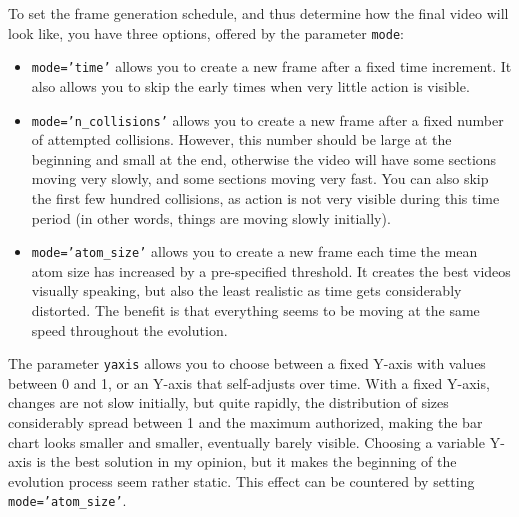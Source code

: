 \documentclass[oneside,10pt]{book}
\begin{document}
To set the frame generation schedule, and thus determine how the final video will look like, you have three options, offered
 by the parameter \texttt{mode}:\vspace{1ex}
\begin{itemize}
\item \texttt{mode='time'} allows you to create a new frame after a fixed time increment. It also allows you to skip the early times when very little action is visible.
\item \texttt{mode='n\_collisions'} allows you to create a new frame after a fixed number of attempted collisions. However, this
  number should be large at the beginning and small at the end, otherwise the video will have some sections moving very slowly, and some sections moving very fast. You can also skip the first few hundred collisions, as action is not very visible during this time period (in other words, things are moving slowly initially).
\item \texttt{mode='atom\_size'} allows you to create a new frame each time the mean atom size has increased by a pre-specified threshold.
 It creates the best videos visually speaking, but also the least realistic as time gets considerably distorted. The benefit is that
 everything seems to be moving at the same speed throughout the evolution.
\end{itemize}\vspace{1ex}


\noindent The parameter \texttt{yaxis} allows you to choose between a fixed Y-axis with values between 0 and 1, or an Y-axis that self-adjusts over time. With a fixed Y-axis, changes are not slow initially, but quite rapidly, the distribution of sizes considerably spread
 between 1 and the maximum authorized, making the bar chart looks smaller and smaller, eventually barely visible.  Choosing a variable Y-axis is the best solution in my opinion, but it makes the beginning of the evolution process seem rather static. This effect can be countered
 by setting \texttt{mode='atom\_size'}.  \vspace{1ex}
\end{document}
